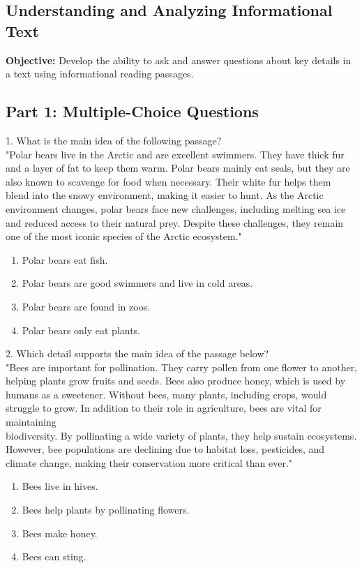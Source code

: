 \documentclass[12pt]{article}
\begin{document}
\subsection*{Understanding and Analyzing Informational Text}
\onehalfspacing

\begin{tcolorbox}[colframe=black!40, colback=gray!0, title=Learning Objective]
\textbf{Objective:} Develop the ability to ask and answer questions about key details in a text using informational reading passages.
\end{tcolorbox}

\subsection*{Part 1: Multiple-Choice Questions}

1. What is the main idea of the following passage? \\
"Polar bears live in the Arctic and are excellent swimmers. They have thick fur and a layer of fat to keep them warm. Polar bears mainly eat seals, but they are also known to scavenge for food when necessary. Their white fur helps them blend into the snowy environment, making it easier to hunt. As the Arctic environment changes, polar bears face new challenges, including melting sea ice and reduced access to their natural prey. Despite these challenges, they remain one of the most iconic species of the Arctic ecosystem."\\
\begin{enumerate}[label=\Alph*.]
    \item Polar bears eat fish.
    \item Polar bears are good swimmers and live in cold areas.
    \item Polar bears are found in zoos.
    \item Polar bears only eat plants.
\end{enumerate}

\vspace{1cm}

2. Which detail supports the main idea of the passage below? \\
"Bees are important for pollination. They carry pollen from one flower to another, helping plants grow fruits and seeds. Bees also produce honey, which is used by humans as a sweetener. Without bees, many plants, including crops, would struggle to grow. In addition to their role in agriculture, bees are vital for maintaining \\biodiversity. By pollinating a wide variety of plants, they help sustain ecosystems. However, bee populations are declining due to habitat loss, pesticides, and climate change, making their conservation more critical than ever."\\
\begin{enumerate}[label=\Alph*.]
    \item Bees live in hives.
    \item Bees help plants by pollinating flowers.
    \item Bees make honey.
    \item Bees can sting.
\end{enumerate}
\end{document}
